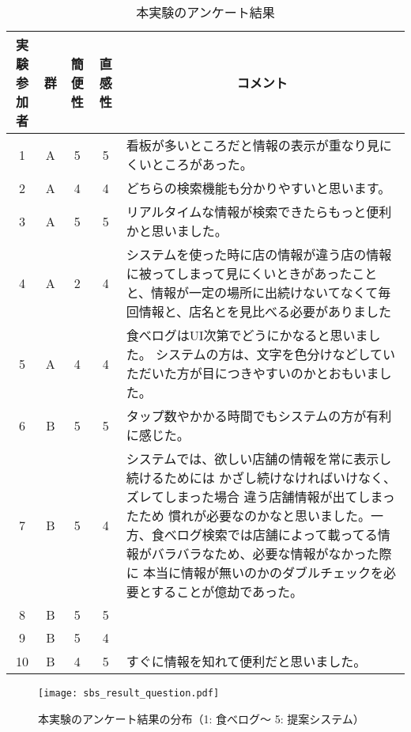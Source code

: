     \begin{table}
      \begin{center}
        \caption{本実験のアンケート結果}
        \label{table:exp_sbs_questionnaire}
        \begin{tabular}{c|cccp{8cm}}
          \hline \hline
          実験参加者 & 群 & 簡便性 & 直感性 & \multicolumn{1}{c}{コメント} \\
          \hline
          1  & A & 5 & 5 & 看板が多いところだと情報の表示が重なり見にくいところがあった。 \\
          2  & A & 4 & 4 & どちらの検索機能も分かりやすいと思います。 \\
          3  & A & 5 & 5 & リアルタイムな情報が検索できたらもっと便利かと思いました。 \\
          4  & A & 2 & 4 & システムを使った時に店の情報が違う店の情報に被ってしまって見にくいときがあったことと、情報が一定の場所に出続けないてなくて毎回情報と、店名とを見比べる必要がありました \\
          5  & A & 4 & 4 & 食べログはUI次第でどうにかなると思いました。 システムの方は、文字を色分けなどしていただいた方が目につきやすいのかとおもいました。 \\
          6  & B & 5 & 5 & タップ数やかかる時間でもシステムの方が有利に感じた。 \\
          7  & B & 5 & 4 & システムでは、欲しい店舗の情報を常に表示し続けるためには かざし続けなければいけなく、ズレてしまった場合 違う店舗情報が出てしまったため 慣れが必要なのかなと思いました。一方、食べログ検索では店舗によって載ってる情報がバラバラなため、必要な情報がなかった際に 本当に情報が無いのかのダブルチェックを必要とすることが億劫であった。 \\
          8  & B & 5 & 5 &  \\
          9  & B & 5 & 4 &  \\
          10 & B & 4 & 5 & すぐに情報を知れて便利だと思いました。 \\
          \hline
        \end{tabular}
      \end{center}
    \end{table}    

    \begin{figure}[tb]
      \begin{center}
        \texttt{[image: sbs\_result\_question.pdf]}
        \caption{本実験のアンケート結果の分布（1: 食べログ〜 5: 提案システム）}
        \label{figure:exp_sbs_result_question}
      \end{center}
    \end{figure}

